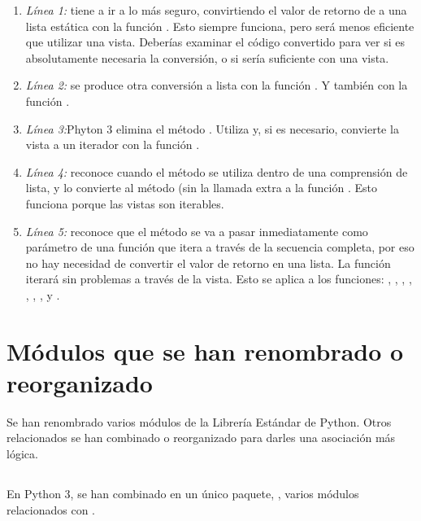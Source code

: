 \begin{enumerate}
  \item \emph{Línea 1:}  tiene a ir a lo más seguro, convirtiendo el valor de retorno de  a una lista estática con la función . Esto siempre funciona, pero será menos eficiente que utilizar una vista. Deberías examinar el código convertido para ver si es absolutamente necesaria la conversión, o si sería suficiente con una vista.
  \item \emph{Línea 2:} se produce otra conversión a lista con la función . Y también con la función .
  \item \emph{Línea 3:}Phyton 3 elimina el método . Utiliza  y, si es necesario, convierte la vista a un iterador con la función .
  \item \emph{Línea 4:}  reconoce cuando el método  se utiliza dentro de una comprensión de lista, y  lo convierte al método  (sin la llamada extra a la función . Esto funciona porque las vistas son iterables.
  \item \emph{Línea 5:}  reconoce que el método  se va a pasar inmediatamente como parámetro de una función que itera a través de la secuencia completa, por eso no hay necesidad de convertir el valor de retorno en una lista. La función  iterará sin problemas a través de la vista. Esto se aplica a los funciones: , , , , , , ,  y .
\end{enumerate}

\section{Módulos que se han renombrado o reorganizado}

Se han renombrado varios módulos de la Librería Estándar de Python. Otros relacionados se han combinado o reorganizado para darles una asociación más lógica.

\subsection{}

En Python 3, se han combinado en un único paquete, , varios módulos relacionados con .

